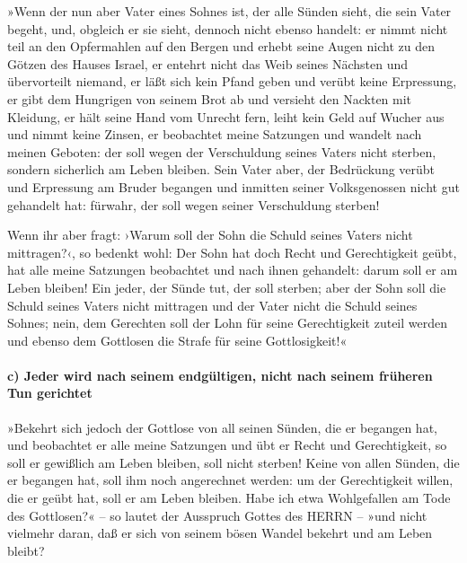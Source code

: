 »Wenn der nun aber Vater eines Sohnes ist, der alle
Sünden sieht, die sein Vater begeht, und, obgleich er sie sieht, dennoch
nicht ebenso handelt: er nimmt nicht teil an den
Opfermahlen auf den Bergen und erhebt seine Augen nicht zu den Götzen
des Hauses Israel, er entehrt nicht das Weib seines Nächsten
und übervorteilt niemand, er läßt sich kein Pfand geben
und verübt keine Erpressung, er gibt dem Hungrigen von seinem Brot ab
und versieht den Nackten mit Kleidung, er hält seine Hand
vom Unrecht fern, leiht kein Geld auf Wucher aus und nimmt keine Zinsen,
er beobachtet meine Satzungen und wandelt nach meinen Geboten: der soll
wegen der Verschuldung seines Vaters nicht sterben, sondern sicherlich
am Leben bleiben. Sein Vater aber, der Bedrückung verübt
und Erpressung am Bruder begangen und inmitten seiner Volksgenossen
nicht gut gehandelt hat: fürwahr, der soll wegen seiner Verschuldung
sterben!

Wenn ihr aber fragt: ›Warum soll der Sohn die Schuld
seines Vaters nicht mittragen?‹, so bedenkt wohl: Der Sohn hat doch
Recht und Gerechtigkeit geübt, hat alle meine Satzungen beobachtet und
nach ihnen gehandelt: darum soll er am Leben bleiben! Ein
jeder, der Sünde tut, der soll sterben; aber der Sohn soll die Schuld
seines Vaters nicht mittragen und der Vater nicht die Schuld seines
Sohnes; nein, dem Gerechten soll der Lohn für seine Gerechtigkeit zuteil
werden und ebenso dem Gottlosen die Strafe für seine Gottlosigkeit!«

\hypertarget{c-jeder-wird-nach-seinem-endguxfcltigen-nicht-nach-seinem-fruxfcheren-tun-gerichtet}{%
\paragraph{c) Jeder wird nach seinem endgültigen, nicht nach seinem
früheren Tun
gerichtet}\label{c-jeder-wird-nach-seinem-endguxfcltigen-nicht-nach-seinem-fruxfcheren-tun-gerichtet}}

»Bekehrt sich jedoch der Gottlose von all seinen Sünden,
die er begangen hat, und beobachtet er alle meine Satzungen und übt er
Recht und Gerechtigkeit, so soll er gewißlich am Leben bleiben, soll
nicht sterben! Keine von allen Sünden, die er begangen
hat, soll ihm noch angerechnet werden: um der Gerechtigkeit willen, die
er geübt hat, soll er am Leben bleiben. Habe ich etwa
Wohlgefallen am Tode des Gottlosen?« -- so lautet der Ausspruch Gottes
des HERRN -- »und nicht vielmehr daran, daß er sich von seinem bösen
Wandel bekehrt und am Leben bleibt?


